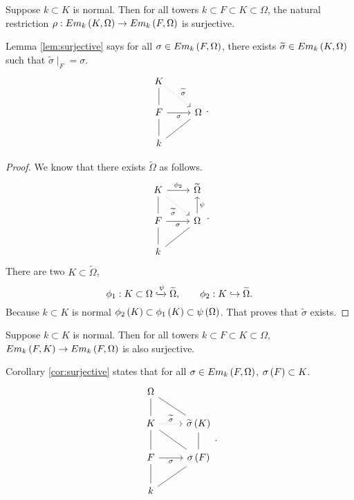 \pagebreak

\begin{lemma}
\label{lem:surjective}
Suppose $ k \subset K $ is normal. Then for all towers $ k \subset F \subset K \subset \Omega $, the natural restriction $ \rho : Em_k\left( K, \Omega \right) \to Em_k\left( F, \Omega \right) $ is surjective.
\end{lemma}


Lemma \ref{lem:surjective} says for all $ \sigma \in Em_k\left( F, \Omega \right) $, there exists $ \widetilde{\sigma} \in Em_k\left( K, \Omega \right) $ such that $ \widetilde{\sigma} \mid_F = \sigma $.
$$
\begin{tikzcd}
K \arrow[dotted]{dr}{\widetilde{\sigma}} & \\
F \arrow[dash]{u} \arrow[swap]{r}{\sigma} & \Omega \\
k \arrow[dash]{u} \arrow[dash]{ur} &
\end{tikzcd}.
$$

\begin{proof}
We know that there exists $ \widetilde{\Omega} $ as follows.
$$
\begin{tikzcd}
K \arrow{r}{\phi_2} \arrow[dotted, swap]{dr}{\widetilde{\sigma}} & \widetilde{\Omega} \\
F \arrow[dash]{u} \arrow[swap]{r}{\sigma} & \Omega \arrow[swap]{u}{\psi} \\
k \arrow[dash]{u} \arrow[dash]{ur} &
\end{tikzcd}.
$$
There are two $ K \subset \widetilde{\Omega} $,
$$
\phi_1 : K \subset \Omega \xhookrightarrow{\psi} \widetilde{\Omega}, \qquad \phi_2 : K \hookrightarrow \widetilde{\Omega}.
$$
Because $ k \subset K $ is normal $ \phi_2\left( K \right) \subset \phi_1\left( K \right) \subset \psi\left( \Omega \right) $. That proves that $ \widetilde{\sigma} $ exists.
\end{proof}

\begin{corollary}
\label{cor:surjective}
Suppose $ k \subset K $ is normal. Then for all towers $ k \subset F \subset K \subset \Omega $, $ Em_k\left( F, K \right) \to Em_k\left( F, \Omega \right) $ is also surjective.
\end{corollary}

Corollary \ref{cor:surjective} states that for all $ \sigma \in Em_k\left( F, \Omega \right) $, $ \sigma\left( F \right) \subset K $.
$$
\begin{tikzcd}
\Omega & \\
K \arrow[dash]{u} \arrow[dotted]{r}{\widetilde{\sigma}} & \widetilde{\sigma}\rb{K} \arrow[dash]{ul} \\
F \arrow[dash]{u} \arrow[swap]{r}{\sigma} & \sigma\rb{F} \arrow[dash]{ul} \arrow[dash]{u} \\
k \arrow[dash]{u} \arrow[dash]{ur} &
\end{tikzcd}.
$$

